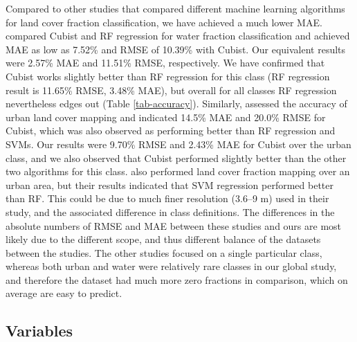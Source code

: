 \documentclass[a4paper,10pt]{article}
\begin{document}
Compared to other studies that compared different machine learning algorithms for land cover fraction classification, we have achieved a much lower \gls{MAE}.
\citet{li_monitoring_2018} compared Cubist and \gls{RF} regression for water fraction classification and achieved \gls{MAE} as low as 7.52\% and \gls{RMSE} of 10.39\% with Cubist.
Our equivalent results were 2.57\% \gls{MAE} and 11.51\% RMSE, respectively.
We have confirmed that Cubist works slightly better than \gls{RF} regression for this class (\gls{RF} regression result is 11.65\% \gls{RMSE}, 3.48\% \gls{MAE}), but overall for all classes \gls{RF} regression nevertheless edges out (Table \ref{tab-accuracy}).
Similarly, \citet{walton2008subpixelrf} assessed the accuracy of urban land cover mapping and indicated 14.5\% \gls{MAE} and 20.0\% \gls{RMSE} for Cubist, which was also observed as performing better than \gls{RF} regression and \glspl{SVM}.
Our results were 9.70\% \gls{RMSE} and 2.43\% \gls{MAE} for Cubist over the urban class, and we also observed that Cubist performed slightly better than the other two algorithms for this class.
\citet{okujeni_comparison_2014} also performed land cover fraction mapping over an urban area, but their results indicated that \gls{SVM} regression performed better than \gls{RF}.
This could be due to much finer resolution (3.6–9 m) used in their study, and the associated difference in class definitions.
The differences in the absolute numbers of \gls{RMSE} and \gls{MAE} between these studies and ours are most likely due to the different scope, and thus different balance of the datasets between the studies.
The other studies focused on a single particular class, whereas both urban and water were relatively rare classes in our global study, and therefore the dataset had much more zero fractions in comparison, which on average are easy to predict.

\subsection{Variables}
\end{document}
